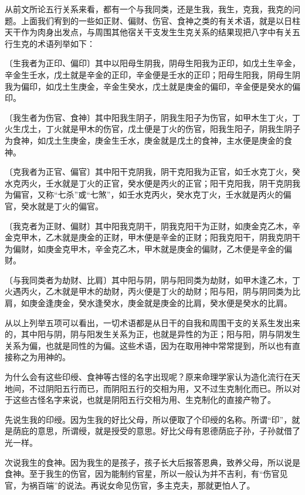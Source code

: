 \documentclass[a5paper,oneside,12pt]{ctexbook}
\newcommand*{\circled}[1]{\ifthenelse{#1 > 10}{\lower.7ex\hbox{\tikz\draw (0pt, 0pt) circle (.5em) node {\makebox[1em][c]{\footnotesize #1}};}}{\lower.7ex\hbox{\tikz\draw (0pt, 0pt) circle (.5em) node {\makebox[1em][c]{\small #1}};}}}
\begin{document}
从前文所论五行关系来看，都有一个与我同类，还是生我，我生，克我，我克的问题。上面我们宥到的一些如正财、偏财、伤官、食神之类的有关术语，就是以日柱天干作为肉身出发点，与周围其他宿关干支发生生克关系的结果现把八字中有关五行生克的术语列举如下：
\begin{enumerate}[label=\circled{\arabic*},parsep=0pt,topsep=0pt,itemsep=0pt,itemindent=2em]
\item 〔生我者为正印、偏印〕其中以阳母生阴我，阴母生阳我为正印，如戊土生辛金，辛金生壬水，戊土就是辛金的正印，辛金便是壬水的正印；阳母生阳我，阴母生阴我为偏印，如戊土生庚金，辛金生癸水，戊土就是庚金的偏印，辛金便是癸水的偏印。
\item 〔我生者为伤官、食神〕其中阳我生阴子，阴我生阳子为伤官，如甲木生丁火，丁火生戊土，丁火就是甲木的伤官，戊土便是丁火的伤官，阳我生阳子，阴我生阴子为食神，如戊土生庚金，庚金生壬水，庚金就是戊土的食神，主水便是庚金的食神。
\item 〔克我者为正官、偏官〕其中阳干克阴我，阴干克阳我为正官，如壬水克丁火，癸水克丙火，壬水就是丁火的正官，癸水便是丙火的正官；阳干克阳我，阴干克阴我为偏官，又称“七杀”或“七煞”，如壬水克丙火，癸水克丁火，壬水就是丙火的偏官，癸水就是丁火的偏官。
\item 〔我克者为正财、偏财〕其中阳我克阴干，阴我克阳干为正财，如庚金克乙木，辛金克甲木，乙木就是庚金的正财，甲木便是辛金的正财；阳我克阳干，阴我克阴干为偏财，如庚金克甲木，辛金克乙木，甲木就是庚金的偏财，乙木便是辛金的偏财。
\item 〔与我同类者为劫财、比肩〕其中阳与阴，阴与阳同类为劫财，如甲木逢乙木，丁火遇丙火，乙木就是甲木的劫财，丙火便是丁火的劫财；阳与阳，阴与阴同类为比肩，如庚金逢庚金，癸水逢癸水，庚金就是庚金的比肩，癸水便是癸水的比肩。 	
\end{enumerate}
从以上列举五项可以看出，一切术语都是从日干的自我和周围干支的关系生发出来的，其中阳与阴，阴与阳发生关系为正，也就是异性的为正；阳与阳，阴与阴发生关系为偏，也就是同性的为偏。这些术语，因为在取用神中常常提到，所以也有直接称之为用神的。

为什么会有这些印绶、食神等古怪的名字出现呢？原来命理学家认为造化流行在天地间，不过阴阳五行而已，而阴阳五行的交相为用，又不过生克制化而已。所以对于这些古怪名字来说，也就是阴阳五行交相为用、生克制化的直接产物了。

先说生我的印绶。因为生我的好比父母，所以便取了个印绶的名称。所谓“印”，就是荫庇的意思，所谓绶，就是授受的意思。好比父母有恩德荫庇子孙，子孙就借了光一样。

次说我生的食神。因为我生的是孩子，孩子长大后报答恩典，致养父母，所以说是食神。至于我生的伤官，因为能制约官星，所以一般认为并不吉利，有“伤官见官，为祸百端”的说法。再说女命见伤官，多主克夫，那就更怕人了。
\end{document}
